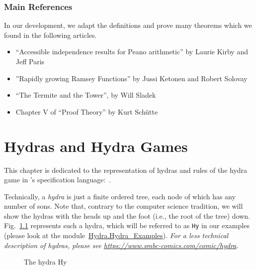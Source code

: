 \subsection*{Main References}

In our development, we adapt the definitions and prove many theorems which
we found in the following articles. 
\begin{itemize}
\item ``Accessible independence results for Peano arithmetic''  by Laurie Kirby and Jeff Paris~\cite{KP82}
\item ''Rapidly growing Ramsey Functions'' by Jussi Ketonen and Robert Solovay~\cite{KS81}
\item ``The Termite and the Tower'', by Will Sladek~\cite{Sladek07thetermite}
\item Chapter V of ``Proof Theory'' by Kurt Schütte~\cite{schutte}
\end{itemize}






\chapter{Hydras and Hydra Games}

\label{sec:orgheadline91}





This chapter is dedicated to the representation of hydras and rules of the hydra game in \coq's specification language:~\gallina. 


Technically, a \emph{hydra} is just a finite ordered tree, each node of which 
has any number of sons. Note that, contrary to the computer science tradition, we will show the hydras 
with the heads up and the foot (i.e., the root of the tree) down.
Fig.~\ref{fig:Hy} represents such  a hydra, which will be referred to as \texttt{Hy} in our examples (please look at the 
module~\href{../theories/html/hydras.Hydra.Hydra_Examples.html}{Hydra.Hydra\_Examples}). 
\emph{For a less technical description of hydras, please see 
\url{https://www.smbc-comics.com/comic/hydra}.}

\begin{figure}[h]
\centering
{}
\caption{The hydra Hy \label{fig:Hy}}
\end{figure}



